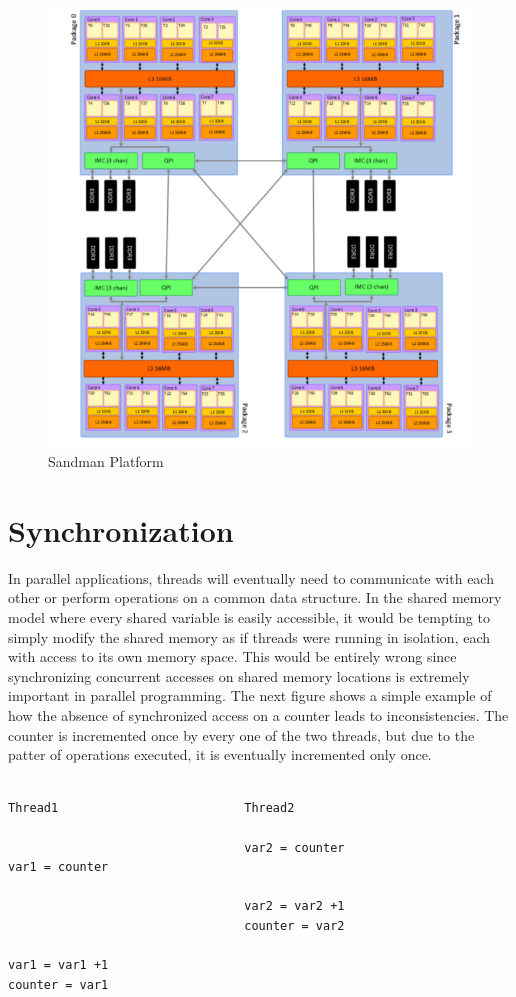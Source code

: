 \begin{figure} 
 \centering 
  \includegraphics[scale=0.5]{sandman_architecture.png} 
\caption{Sandman Platform} 
\label{sandman_architecture} 
\end{figure} 

\section{Synchronization}

In parallel applications, threads will eventually need to communicate with each other or perform operations on a common data structure. In the shared memory model where every shared variable is easily accessible, it would be tempting to simply modify the shared memory as if threads were running in isolation, each with access to its own memory space. This would be entirely wrong since synchronizing concurrent accesses on shared memory locations is extremely important in parallel programming. The next figure shows a simple example of how the absence of synchronized access on a counter leads to inconsistencies. The counter is incremented once by every one of the two threads, but due to the patter of operations executed, it is eventually incremented only once.

\begin{lstlisting}
	
Thread1                          Thread2

                                 var2 = counter
var1 = counter	

                                 var2 = var2 +1
                                 counter = var2

var1 = var1 +1
counter = var1

\end{lstlisting}

